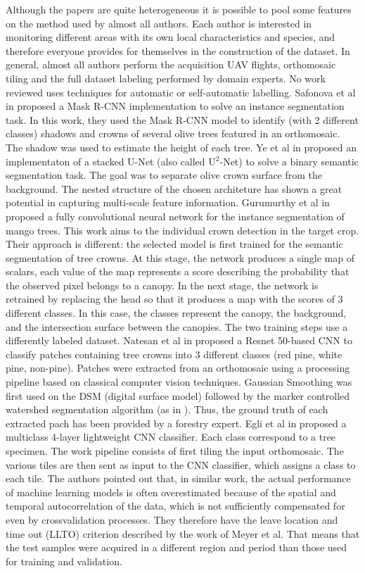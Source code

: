\documentclass[comsoc,final]{IEEEtran}
\begin{document}
Although the papers are quite heterogeneous it is possible to pool some features
on the method used by almost all authors. Each author is interested
in monitoring different areas with its own local characteristics and species, and therefore everyone
provides for themselves in the construction of the dataset. In general, almost all authors perform the acquisition UAV flights, orthomosaic tiling and the full dataset labeling performed by domain experts.
No work reviewed uses techniques for automatic or self-automatic labelling.
Safonova et al in \cite{s21051617} proposed a Mask R-CNN implementation to solve an instance segmentation task.
In this work, they used the Mask R-CNN model to identify (with 2 different classes) shadows and crowns of several olive trees featured in an orthomosaic.
The shadow was used to estimate the height of each tree. 
Ye et al in \cite{rs14061523} proposed an implementaton of a stacked U-Net (also called U$^2$-Net) to solve a binary semantic segmentation task. 
The goal was to separate olive crown surface from the background. 
The nested structure of the chosen architeture has shown a great potential in capturing multi-scale feature information.
Gurumurthy et al in \cite{gurumurthy_mango_2019} proposed a fully convolutional neural network for the instance segmentation of mango trees. 
This work aims to the individual crown detection in the target crop. 
Their approach is different: the selected model is first trained for the semantic segmentation of tree crowns. 
At this stage, the network produces a single map of scalars, each value of the map represents a score describing the probability that the observed pixel belongs to a canopy. 
In the next stage, the network is retrained by replacing the head so that it produces a map with the scores of 3 different classes. 
In this case, the classes represent the canopy, the background, and the intersection surface between the canopies. 
The two training steps use a differently labeled dataset.
Natesan et al in \cite{Natesan2019475} proposed  a Resnet 50-based CNN to classify patches containing tree crowns into 3 different classes (red pine, white pine, non-pine). 
Patches were extracted from an orthomosaic using a processing pipeline based on classical computer vision techniques. 
Gaussian Smoothing was first used on the DSM (digital surface model) followed by the marker controlled watershed segmentation algorithm (as in \cite{Vepakomma2018}).
Thus, the ground truth of each extracted pach has been provided by a forestry expert. 
Egli et al in \cite{Egli20201} proposed a multiclass 4-layer lightweight CNN classifier. 
Each class correspond to a tree specimen.
The work pipeline consists of first tiling the input orthomosaic. 
The various tiles are then sent as input to the CNN classifier, which assigns a class to each tile. 
The authors pointed out that, in similar work, the actual performance of machine learning models is often overestimated because of the spatial and temporal autocorrelation of the data, which is not sufficiently compensated for even by crossvalidation processes. 
They therefore have the leave location and time out (LLTO) criterion described by the work of Meyer et al. 
That means that the test samples were acquired in a different region and period than those used for training and validation.
\end{document}
